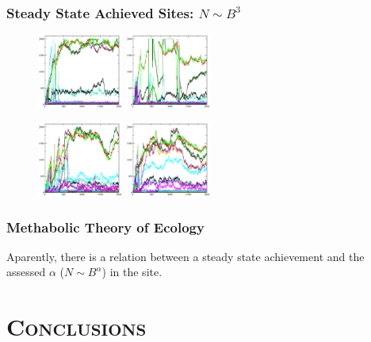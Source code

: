 \documentclass[xcolor=x11names,compress]{beamer}
\renewcommand{\(}{\begin{columns}}
\renewcommand{\)}{\end{columns}}
\newcommand{\<}[1]{\begin{column}{#1}}
\renewcommand{\>}{\end{column}}
\begin{document}
\begin{frame}
\frametitle{Steady State Achieved Sites: $N \sim B^{3}$}
\begin{figure}
\includegraphics[width=0.25\textwidth]{./TS_s17_st29_Alpha_3_05}
\includegraphics[width=0.25\textwidth]{./TS_s17_st71_Alpha3_04}
\end{figure}
\begin{figure}
\includegraphics[width=0.25\textwidth]{./TS_s27_st2_Alpha2_99}
\includegraphics[width=0.25\textwidth]{./TS_s27_st33_Alpha2_85}
\end{figure}
\end{frame}

\begin{frame}
\frametitle{Methabolic Theory of Ecology}
\begin{block}{}
Aparently, there is a relation between a steady state achievement and the assessed $\alpha$ ($N \sim B^{\alpha}$) in the site. 
\end{block}
\end{frame}




\section{\scshape Conclusions}
\end{document}
